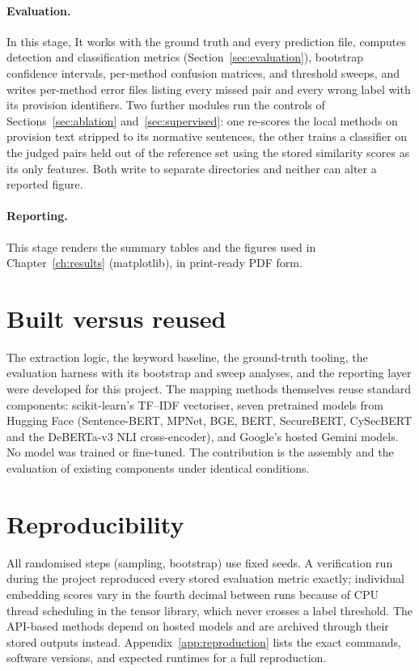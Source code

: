 \paragraph{Evaluation.} In this stage, It works with the ground truth and every prediction file,
computes detection and classification metrics
(Section~\ref{sec:evaluation}), bootstrap confidence intervals, per-method
confusion matrices, and threshold sweeps, and writes per-method error files
listing every missed pair and every wrong label with its provision
identifiers. Two further modules run the controls of
Sections~\ref{sec:ablation} and~\ref{sec:supervised}: one re-scores the local
methods on provision text stripped to its normative sentences, the other trains a
classifier on the judged pairs held out of the reference set using the stored
similarity scores as its only features. Both write to separate directories and
neither can alter a reported figure.

\paragraph{Reporting.} This stage renders the summary tables and the figures used in
Chapter~\ref{ch:results} (matplotlib), in print-ready PDF form.

\section{Built versus reused}

The extraction logic, the keyword baseline, the ground-truth tooling, the
evaluation harness with its bootstrap and sweep analyses, and the reporting
layer were developed for this project. The mapping methods themselves reuse
standard components: scikit-learn's TF--IDF vectoriser, seven pretrained models
from Hugging Face (Sentence-BERT, MPNet, BGE, BERT, SecureBERT, CySecBERT and
the DeBERTa-v3 NLI cross-encoder), and Google's hosted Gemini models. No model
was trained or fine-tuned. The contribution is the assembly and the evaluation
of existing components under identical conditions.

\section{Reproducibility}

All randomised steps (sampling, bootstrap) use fixed seeds. A verification run
during the project reproduced every stored evaluation metric exactly;
individual embedding scores vary in the fourth decimal between runs because of
CPU thread scheduling in the tensor library, which never crosses a label
threshold. The API-based methods depend on hosted models and are archived
through their stored outputs instead. Appendix~\ref{app:reproduction} lists the exact commands, software
versions, and expected runtimes for a full reproduction.

